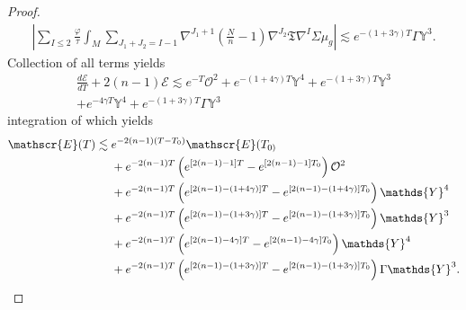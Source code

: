 \documentclass{amsart}
\begin{document}
\begin{proof}
\begin{align}
|\sum_{I\leq 2}\frac{\varphi}{\tau}\int_{M}\sum_{J_{1}+J_{2}=I-1}\nabla^{J_{1}+1}(\frac{N}{n}-1)\nabla^{J_{2}}\mathfrak{T}\nabla^{I}\Sigma\mu_{g}| \lesssim e^{-(1+3\gamma)T}\Gamma\mathds{Y}^{3}.   
\end{align}
Collection of all terms yields 
\begin{align}
\frac{d\mathscr{E}}{dT}+2(n-1)\mathscr{E}\lesssim e^{-T}\mathcal{O}^{2}+e^{-(1+4\gamma)T}\mathds{Y}^{4}+e^{-(1+3\gamma)T}\mathds{Y}^{3}\\\nonumber+e^{-4\gamma T}\mathds{Y}^{4}+e^{-(1+3\gamma)T}\Gamma\mathds{Y}^{3}
\end{align}
integration of which yields 
\begin{align}
\mathscr{E}(T) \lesssim\; & e^{-2(n-1)(T-T_{0})} \mathscr{E}(T_{0)} \notag \\
& + e^{-2(n-1)T} \left(e^{[2(n-1)-1]T} - e^{[2(n-1)-1]T_{0}}\right) \mathcal{O}^{2} \notag \\
& + e^{-2(n-1)T} \left(e^{[2(n-1)-(1+4\gamma)]T} - e^{[2(n-1)-(1+4\gamma)]T_{0}}\right) \mathds{Y}^{4} \notag \\
& + e^{-2(n-1)T} \left(e^{[2(n-1)-(1+3\gamma)]T} - e^{[2(n-1)-(1+3\gamma)]T_{0}}\right) \mathds{Y}^{3} \notag \\
& + e^{-2(n-1)T} \left(e^{[2(n-1)-4\gamma]T} - e^{[2(n-1)-4\gamma]T_{0}}\right) \mathds{Y}^{4} \notag \\
& + e^{-2(n-1)T} \left(e^{[2(n-1)-(1+3\gamma)]T} - e^{[2(n-1)-(1+3\gamma)]T_{0}}\right) \Gamma \mathds{Y}^{3}.
\end{align}


\end{proof}
\end{document}

